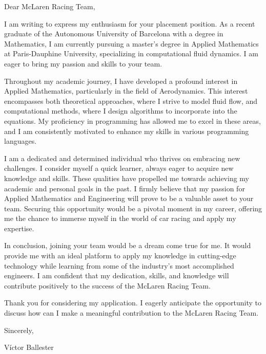 \documentclass[11pt]{letter}
\newcommand{\teamname}{McLaren Racing Team}
\begin{document}
\thispagestyle{empty}
Dear \teamname,

I am writing to express my enthusiasm for your placement position. As a recent graduate of the Autonomous University of Barcelona with a degree in Mathematics, I am currently pursuing a master's degree in Applied Mathematics at Paris-Dauphine University, specializing in computational fluid dynamics. I am eager to bring my passion and skills to your team.


Throughout my academic journey, I have developed a profound interest in Applied Mathematics, particularly in the field of Aerodynamics. This interest encompasses both theoretical approaches, where I strive to model fluid flow, and computational methods, where I design algorithms to incorporate into the equations. My proficiency in programming has allowed me to excel in these areas, and I am consistently motivated to enhance my skills in various programming languages.

I am a dedicated and determined individual who thrives on embracing new challenges. I consider myself a quick learner, always eager to acquire new knowledge and skills. These qualities have propelled me towards achieving my academic and personal goals in the past. I firmly believe that my passion for Applied Mathematics and Engineering will prove to be a valuable asset to your team. Securing this opportunity would be a pivotal moment in my career, offering me the chance to immerse myself in the world of car racing and apply my expertise.

In conclusion, joining your team would be a dream come true for me. It would provide me with an ideal platform to apply my knowledge in cutting-edge technology while learning from some of the industry's most accomplished engineers. I am confident that my dedication, skills, and knowledge will contribute positively to the success of the \teamname.

Thank you for considering my application. I eagerly anticipate the opportunity to discuss how can I make a meaningful contribution to the \teamname.

Sincerely,

Víctor Ballester
\end{document}
